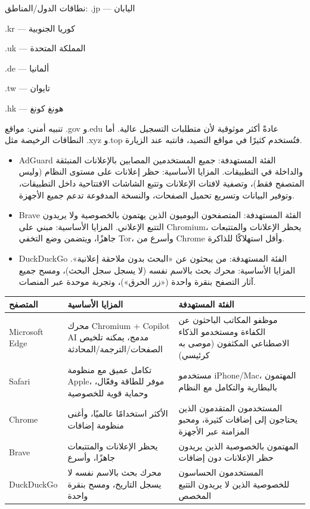 نطاقات الدول/المناطق: .jp — اليابان

.kr — كوريا الجنوبية

.uk — المملكة المتحدة

.de — ألمانيا

.tw — تايوان

.hk — هونغ كونغ

تنبيه أمني: مواقع .gov و.edu عادةً أكثر موثوقية لأن متطلبات التسجيل عالية. أما النطاقات الرخيصة مثل .xyz و.top فتُستخدم كثيرًا في مواقع التصيد، فانتبه عند الزيارة.


\begin{itemize}
  \item AdGuard الفئة المستهدفة: جميع المستخدمين المصابين بالإعلانات المنبثقة والداخلة في التطبيقات. المزايا الأساسية: حظر إعلانات على مستوى النظام (وليس المتصفح فقط)، وتصفية لافتات الإعلانات وتتبع الشاشات الافتتاحية داخل التطبيقات، وتوفير البيانات وتسريع تحميل الصفحات، والنسخة المدفوعة تدعم جميع الأجهزة.
\end{itemize}


\begin{itemize}
  \item Brave الفئة المستهدفة: المتصفحون اليوميون الذين يهتمون بالخصوصية ولا يريدون التتبع الإعلاني. المزايا الأساسية: مبني على Chromium، يحظر الإعلانات والمتتبعات جاهزًا، ويتضمن وضع التخفي Tor، وأسرع من Chrome وأقل استهلاكًا للذاكرة.
  \item DuckDuckGo الفئة المستهدفة: من يبحثون عن «البحث بدون ملاحقة إعلانية». المزايا الأساسية: محرك بحث بالاسم نفسه (لا يسجل سجل البحث)، ومسح جميع آثار التصفح بنقرة واحدة («زر الحرق»)، وتجربة موحدة عبر المنصات.
\end{itemize}


\begin{center}
\begin{tabularx}{\linewidth}{|X|X|X|}
\hline
\textbf{المتصفح} & \textbf{المزايا الأساسية} & \textbf{الفئة المستهدفة} \tabularnewline
\hline
Microsoft Edge & محرك Chromium + Copilot AI مدمج، يمكنه تلخيص الصفحات/الترجمة/المحادثة & موظفو المكاتب الباحثون عن الكفاءة ومستخدمو الذكاء الاصطناعي المكثفون (موصى به كرئيسي) \tabularnewline
Safari & تكامل عميق مع منظومة Apple، موفر للطاقة وفعّال، وحماية قوية للخصوصية & مستخدمو iPhone/Mac، المهتمون بالبطارية والتكامل مع النظام \tabularnewline
Chrome & الأكثر استخدامًا عالميًا، وأغنى منظومة إضافات & المستخدمون المتقدمون الذين يحتاجون إلى إضافات كثيرة، ومحبو المزامنة عبر الأجهزة \tabularnewline
Brave & يحظر الإعلانات والمتتبعات جاهزًا، وأسرع & المهتمون بالخصوصية الذين يريدون حظر الإعلانات دون إضافات \tabularnewline
DuckDuckGo & محرك بحث بالاسم نفسه لا يسجل التاريخ، ومسح بنقرة واحدة & المستخدمون الحساسون للخصوصية الذين لا يريدون التتبع المخصص \tabularnewline
\hline
\end{tabularx}
\end{center}

